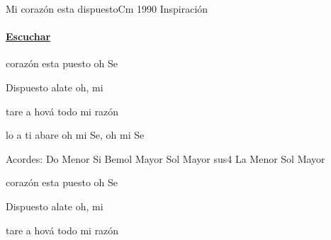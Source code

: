 \documentclass[12pt, spanish]{book}
\begin{document}
    \begin{song}{Mi corazón esta dispuesto}{Cm}
        {1990} %
        {Inspiración}
        {} %
        {}
        \ifChordBk
        \paragraph{\mbox{}\hfill\protect\href{https://open.spotify.com/intl-es/track/530r5dV0cPrvoIZHRrGbQ1}{Escuchar}\mbox{}\hfill}
        \fi


        \begin{SBOpGroup}
             corazón esta puesto oh Se

            Dispuesto alate oh, mi 
        \end{SBOpGroup}


        \begin{SBChorus}
            tare a hová  todo mi razón

            lo a ti abare oh mi Se, oh mi Se
        \end{SBChorus}

        \ifChordBk
        \begin{SBOpGroup}
            Acordes:\break
            \upchord{\Cm}\qquad Do Menor \hfill
            \upchord{\Bflat}\qquad Si Bemol Mayor \hfill\null\break
            \upchord{\Gsus}\qquad Sol Mayor sus4 \hfill
            \upchord{\Am}\qquad La Menor \hfill
            \upchord{\G}\qquad Sol Mayor \hfill\null\break
        \end{SBOpGroup}
        \clearpage
        \fi

        \begin{SBExtraKeys}{

            \begin{SBOpGroup}
                 corazón esta puesto oh Se

                Dispuesto alate oh, mi 
            \end{SBOpGroup}


            \begin{SBChorus}
                tare a hová  todo mi razón


\end{SBChorus}}
\end{SBExtraKeys}
\end{song}
\end{document}
